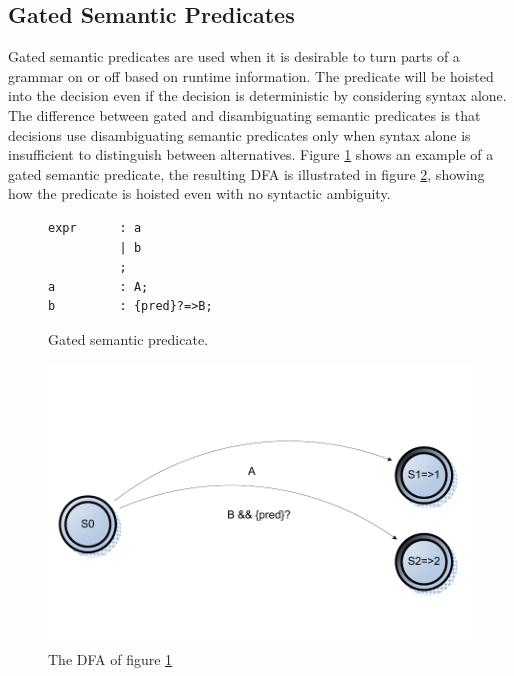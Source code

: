 \subsection{Gated Semantic Predicates}
\label{sect:antlr:gate_semantic_preds}
Gated semantic predicates are used when it is desirable to turn parts of a grammar on or off based on runtime information. The predicate will be hoisted into the decision even if the decision is deterministic by considering syntax alone. The difference between gated and disambiguating semantic predicates is that decisions use disambiguating semantic predicates only when syntax alone is insufficient to distinguish between alternatives. Figure \ref{code:gatedSemantic} shows an example of a gated semantic predicate, the resulting DFA is illustrated in figure \ref{fig:dfaGated}, showing how the predicate is hoisted even with no syntactic ambiguity.

\begin{figure}[h!]
\begin{verbatim}
expr      : a 
          | b
          ; 
a         : A;
b         : {pred}?=>B;
\end{verbatim}
\caption{Gated semantic predicate.}
\label{code:gatedSemantic}
\end{figure}

\begin{figure}[!h]
  \centering
    \includegraphics[scale=0.6]{img/gatedsemantic}
  \caption{The DFA of figure \ref{code:gatedSemantic}}
  \label{fig:dfaGated}
\end{figure}

